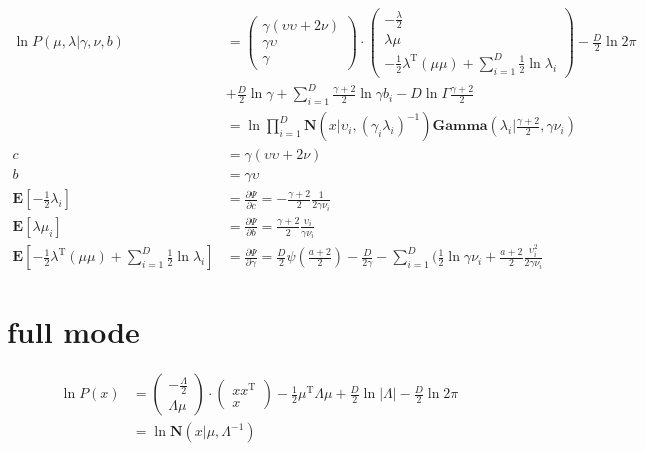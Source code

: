 \documentclass{article}
\begin{document}
$$
\begin{aligned}
\ln P(\mu,\lambda | \gamma, \nu, b) &=
\left(
    \begin{aligned}
        \gamma(\upsilon\upsilon + 2\nu)\\
        \gamma \upsilon\\
        \gamma
    \end{aligned}
\right)
\cdot
\left(
    \begin{aligned}
        - \frac{\lambda}{2}\\
        \lambda \mu\\
        -\frac{1}{2}\lambda ^ \mathrm{T} (\mu \mu) + \sum_{i=1}^{D}\frac{1}{2} \ln \lambda_i
    \end{aligned}
\right)
- \frac{D}{2}\ln2\pi\\
&+ \frac{D}{2}\ln\gamma
+ \sum_{i=1}^{D}\frac{\gamma+2}{2}\ln \gamma b_i
- D\ln\Gamma\frac{\gamma + 2}{2}\\
&= \ln\prod_{i=1}^{D}\textbf{N}(x|\upsilon_i, (\gamma_i \lambda_i)^{-1}) \textbf{Gamma}(\lambda_i | \frac{\gamma + 2}{2}, \gamma\nu_i)\\
c
    &= \gamma(\upsilon\upsilon + 2\nu)\\
b   &= \gamma\upsilon\\
\textbf{E}[{-\frac{1}{2}\lambda_i}]
    &= \frac{\partial\Psi}{\partial c} = -\frac{\gamma + 2}{2}\frac{1}{2\gamma\nu_i}\\
\textbf{E}[{\lambda \mu_i}]
    &= \frac{\partial\Psi}{\partial b} = \frac{\gamma + 2}{2}\frac{\upsilon_i}{\gamma\nu_i}\\
\textbf{E}[{-\frac{1}{2}\lambda ^ \mathrm{T} (\mu \mu) + \sum_{i=1}^{D}\frac{1}{2} \ln \lambda_i}]
    &= \frac{\partial\Psi}{\partial \gamma} = \frac{D}{2} \psi(\frac{a + 2}{2}) - \frac{D}{2\gamma} - \sum_{i=1}^{D}(\frac{1}{2}\ln\gamma\nu_i + \frac{a+2}{2}\frac{\upsilon_i^2}{2\gamma\nu_i}
\end{aligned}
$$

\section{full mode}
$$
\begin{aligned}
\ln P(x)& =
\left(
    \begin{aligned}
        - \frac{\Lambda}{2}\\
        \Lambda \mu
    \end{aligned}
\right)
\cdot
\left(
    \begin{aligned}
        xx^\mathrm{T}\\
        x
    \end{aligned}
\right) -\frac{1}{2}\mu ^ \mathrm{T} \Lambda \mu + \frac{D}{2} \ln |\Lambda| - \frac{D}{2} \ln2\pi \\
& = \ln\textbf{N}(x|\mu,\Lambda^{-1})
\end{aligned}
$$
\end{document}
